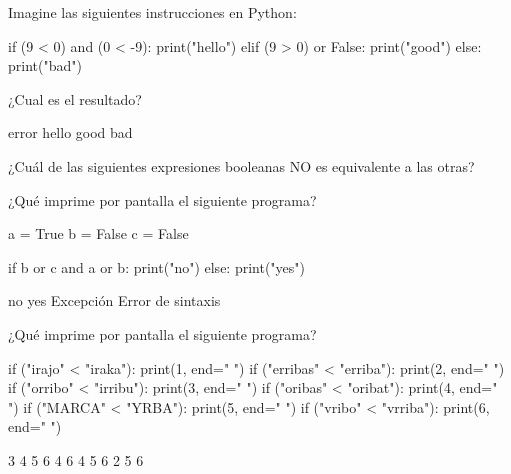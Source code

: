 \begin{ejercicio}Imagine las siguientes instrucciones en Python:
\begin{python}
if (9 < 0) and (0 < -9):
    print("hello")
elif (9 > 0) or False:
    print("good")
else:
    print("bad")
\end{python}

¿Cual es el resultado?

\begin{choices}
    \choice error
    \choice hello
    \choice good %
    \choice bad
\end{choices} \end{ejercicio}


\begin{ejercicio}¿Cuál de las siguientes expresiones booleanas NO es equivalente a las otras?

\begin{choices}
    \choice {} %
    \choice  {}
    \choice {}
    \choice {}
\end{choices} \end{ejercicio}


\begin{ejercicio}
¿Qué imprime por pantalla el siguiente programa?

\begin{python}
a = True
b = False
c = False

if b or c and a or b:
    print("no")
else:
    print("yes")
    \end{python}

\begin{choices}
    \choice no
    \choice yes %
    \choice Excepción
    \choice Error de sintaxis
\end{choices} 
\end{ejercicio}


\begin{ejercicio} ¿Qué imprime por pantalla el siguiente programa?
\begin{python}
if ("irajo" < "iraka"):
    print(1, end=" ")
if ("erribas" < "erriba"):
    print(2, end=" ")
if ("orribo" < "irribu"):
    print(3, end=" ")
if ("oribas" < "oribat"):
    print(4, end=" ")
if ("MARCA" < "YRBA"):
    print(5, end=" ")    
if ("vribo" < "vrriba"):
    print(6, end=" ")
\end{python}

\begin{choices}
     3 4 5 6
     4 6
     4 5 6   %
     2 5 6
\end{choices}
\end{ejercicio}

